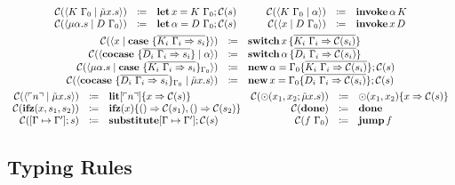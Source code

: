 \begin{gather*}
\begin{array}{rclrcl}
    \collapse{\cut{K\ \Gamma_0}{\tilde{\mu}x.s}} & \coloneq & \letac{x}{K\ \Gamma_0}{\collapse{s}} & \qquad
    \collapse{\cut{K\ \Gamma_0}{\alpha}} & \coloneq & \invoke{\alpha}{K} \\
    \collapse{\cut{\mu\alpha.s}{D\ \Gamma_0}} & \coloneq & \letac{\alpha}{D\ \Gamma_0}{\collapse{s}} &
    \collapse{\cut{x}{D\ \Gamma_0}} & \coloneq & \invoke{x}{D} \\
  \end{array}
  \\
  \begin{array}{rcl}
    \collapse{\cut{x}{\case{\overline{K_i\ \Gamma_i \Rightarrow s_i}}}} & \coloneq & \switch{x}{\bra{\overline{K_i\ \Gamma_i \Rightarrow \collapse{s_i}}}} \\
    \collapse{\cut{\cocase{\overline{D_i\ \Gamma_i \Rightarrow s_i}}}{\alpha}} & \coloneq & \switch{\alpha}{\bra{\overline{D_i\ \Gamma_i \Rightarrow \collapse{s_i}}}} \\
    \collapse{\cut{\mu\alpha.s}{\case{\overline{K_i\ \Gamma_i \Rightarrow s_i}}_{\Gamma_0}}} & \coloneq & \new{\alpha}{\Gamma_0 \bra{\overline{K_i\ \Gamma_i \Rightarrow \collapse{s_i}}}}{\collapse{s}} \\
    \collapse{\cut{\cocase{\overline{D_i\ \Gamma_i \Rightarrow s_i}}_{\Gamma_0}}{\tilde{\mu}x.s}} & \coloneq & \new{x}{\Gamma_0 \bra{\overline{D_i\ \Gamma_i \Rightarrow \collapse{s_i}}}}{\collapse{s}} \\
  \end{array}
  \\
  \begin{array}{rclrcl}
    \collapse{\cut{\lit{n}}{\tilde{\mu}x.s}} & \coloneq & \litac{n}{x}{\collapse{s}} &
    \collapse{\odot(x_1, x_2; \tilde{\mu}x.s)} & \coloneq & \opac{x_1, x_2}{x}{\collapse{s}} \\
    \collapse{\ifz{x}{s_1}{s_2}} & \coloneq & \ifzac{x}{\collapse{s_1}}{\collapse{s_2}} &
    \collapse{\done} & \coloneq & \done \\
    \collapse{\substitute{\Gamma \mapsto \Gamma^{\prime}}{s}} & \coloneq & \substituteac{\Gamma \mapsto \Gamma^{\prime}}{\collapse{s}} &
    \collapse{f\ \Gamma_0} & \coloneq & \jump{f} \\
  \end{array}
\end{gather*}


\subsection{Typing Rules}
\label{subsec:axcut:typing-rules}

